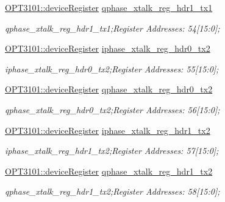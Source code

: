 \begin{DoxyCompactItemize}
\mbox{\hyperlink{class_o_p_t3101_1_1device_register}{O\+P\+T3101\+::device\+Register}} \mbox{\hyperlink{class_o_p_t3101_1_1registers_a0d5f4bb0aaa58ed3a96bb2740eb6287e}{qphase\+\_\+xtalk\+\_\+reg\+\_\+hdr1\+\_\+tx1}}
\begin{DoxyCompactList}\small\item\em qphase\+\_\+xtalk\+\_\+reg\+\_\+hdr1\+\_\+tx1;Register Addresses\+: 54\mbox{[}15\+:0\mbox{]}; \end{DoxyCompactList}\item 
\mbox{\hyperlink{class_o_p_t3101_1_1device_register}{O\+P\+T3101\+::device\+Register}} \mbox{\hyperlink{class_o_p_t3101_1_1registers_a22ff46f9ece016455819cf6c05e64274}{iphase\+\_\+xtalk\+\_\+reg\+\_\+hdr0\+\_\+tx2}}
\begin{DoxyCompactList}\small\item\em iphase\+\_\+xtalk\+\_\+reg\+\_\+hdr0\+\_\+tx2;Register Addresses\+: 55\mbox{[}15\+:0\mbox{]}; \end{DoxyCompactList}\item 
\mbox{\hyperlink{class_o_p_t3101_1_1device_register}{O\+P\+T3101\+::device\+Register}} \mbox{\hyperlink{class_o_p_t3101_1_1registers_ae1b46ec8ae50fe43135774870ab5d5b7}{qphase\+\_\+xtalk\+\_\+reg\+\_\+hdr0\+\_\+tx2}}
\begin{DoxyCompactList}\small\item\em qphase\+\_\+xtalk\+\_\+reg\+\_\+hdr0\+\_\+tx2;Register Addresses\+: 56\mbox{[}15\+:0\mbox{]}; \end{DoxyCompactList}\item 
\mbox{\hyperlink{class_o_p_t3101_1_1device_register}{O\+P\+T3101\+::device\+Register}} \mbox{\hyperlink{class_o_p_t3101_1_1registers_a396303672400989a1aecc7b79386b681}{iphase\+\_\+xtalk\+\_\+reg\+\_\+hdr1\+\_\+tx2}}
\begin{DoxyCompactList}\small\item\em iphase\+\_\+xtalk\+\_\+reg\+\_\+hdr1\+\_\+tx2;Register Addresses\+: 57\mbox{[}15\+:0\mbox{]}; \end{DoxyCompactList}\item 
\mbox{\hyperlink{class_o_p_t3101_1_1device_register}{O\+P\+T3101\+::device\+Register}} \mbox{\hyperlink{class_o_p_t3101_1_1registers_aae788b0ecb140f7ed12299e7f353440f}{qphase\+\_\+xtalk\+\_\+reg\+\_\+hdr1\+\_\+tx2}}
\begin{DoxyCompactList}\small\item\em qphase\+\_\+xtalk\+\_\+reg\+\_\+hdr1\+\_\+tx2;Register Addresses\+: 58\mbox{[}15\+:0\mbox{]}; \end{DoxyCompactList}\item 

\end{DoxyCompactItemize}
